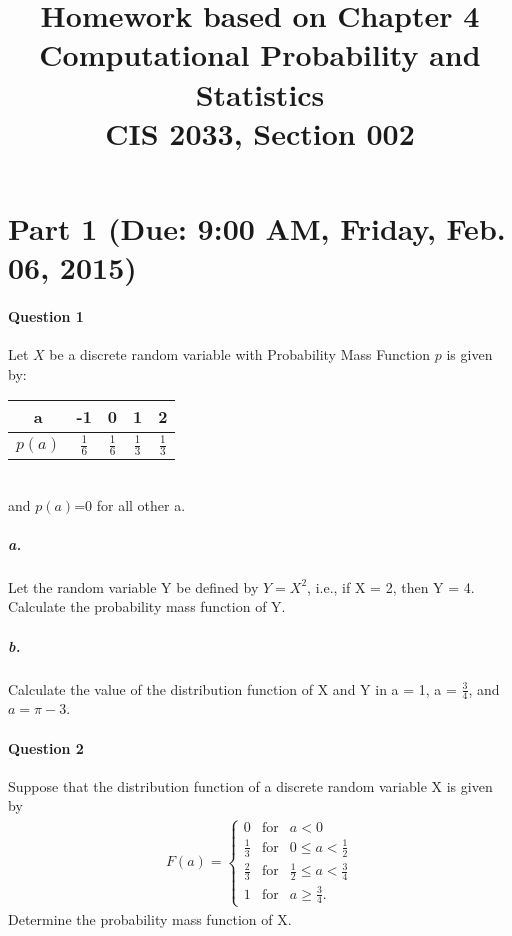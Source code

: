 \documentclass[11pt]{article} %
\title{Homework based on Chapter 4\\
Computational Probability and Statistics \\
CIS 2033, Section 002}
\author{}
\date{} %
\begin{document}
\maketitle

\section{Part 1 (Due: 9:00 AM, Friday, Feb. 06, 2015)}

\paragraph*{\bf Question 1}
Let $X$ be a discrete random variable with Probability Mass Function $p$ is given by: \\
\begin{table}[h!]
\begin{center}
\begin{tabular}{c|cccc} \hline
a & -1 & 0 & 1 & 2 \\ \hline
$p(a)$ & $\frac{1}{6}$ & $\frac{1}{6}$ & $\frac{1}{3}$ & $\frac{1}{3}$ \\ \hline
\end{tabular}
\label{ta1}
\end{center}
\end{table}
\\ and $p(a)$=0 for all other a. 

\subparagraph*{a.} Let the random variable Y be defined by $Y=X^2$, i.e., if X = 2, then Y = 4. Calculate the probability mass function of Y. 
\subparagraph*{b.} Calculate the value of the distribution function of X and Y in a = 1, a = $\frac{3}{4}$, and $a=\pi - 3$. 


\paragraph*{\bf Question 2}
Suppose that the distribution function of a discrete random variable X is given by 
\begin{align*}
F(a) = \left\{ 
\begin{array}{rcl}
0 & \mbox{for} & a < 0\\
\frac{1}{3} & \mbox{for} & 0 \leq a < \frac{1}{2} \\
\frac{2}{3} & \mbox{for} & \frac{1}{2} \leq a < \frac{3}{4} \\
1 & \mbox{for} & a \geq \frac{3}{4}.
\end{array} \right.
\end{align*}
Determine the probability mass function of X. 
\end{document}
